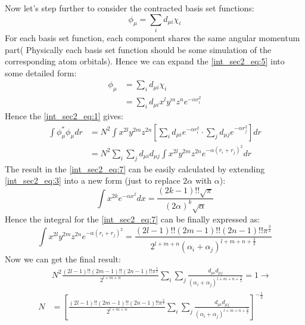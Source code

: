 Now let's step further to consider the contracted basis set functions:
\begin{equation}
  \label{int_sec2_eq:5}
\phi_{\mu} = \sum_{i}d_{\mu i}\chi_{i}
\end{equation}
For each basis set function, each component shares the same angular momentum part(
Physically each basis set function should be some simulation of the corresponding
atom orbitals). Hence we can expand the \ref{int_sec2_eq:5} into some detailed form:
\begin{align}
 \label{int_sec2_eq:6}
\phi_{\mu} &= \sum_{i}d_{\mu i}\chi_{i} \nonumber \\
&= \sum_{i}d_{\mu i} x^{l}y^{m}z^{n}e^{-\alpha r_{i}^{2}} 
\end{align}
Hence the \ref{int_sec2_eq:1} gives:
\begin{equation}
 \label{int_sec2_eq:7}
\begin{split}
 \int \phi_{\mu}^{*}\phi_{\mu} dr &= N^{2}\int x^{2l}y^{2m}z^{2n}
\left[ \sum_{i}d_{\mu i}e^{-\alpha r_{i}^{2}}\cdot\sum_{j}d_{\mu j}e^{-\alpha r_{j}^{2}}\right]
dr \\ 
&= N^{2}\sum_{i}\sum_{j}d_{\mu i}d_{\mu j}\int x^{2l}y^{2m}z^{2n}
e^{-\alpha (r_{i}+r_{j})^{2}} dr
\end{split}
\end{equation}
The result in the \ref{int_sec2_eq:7} can be easily calculated by extending \ref{int_sec2_eq:3}
into a new form (just to replace $2\alpha$ with $\alpha$):
\begin{equation}
 \label{int_sec2_eq:8}
\int x^{2k}e^{-\alpha x^{2}} dx = 
\frac{(2k-1)!!\sqrt{\pi}}{(2\alpha)^{k}\sqrt{\alpha}}
\end{equation}
Hence the integral for the \ref{int_sec2_eq:7} can be finally expressed as:
\begin{equation}
 \label{int_sec2_eq:9}
\int x^{2l}y^{2m}z^{2n}e^{-\alpha (r_{i}+r_{j})^{2}} = 
\frac{(2l-1)!!(2m-1)!!(2n-1)!!\pi^{\frac{3}{2}}}{2^{l+m+n}(\alpha_{i}+\alpha_{j})^{l+m+n+\frac{3}{2}}}
\end{equation}
Now we can get the final result:
\begin{align}
 \label{int_sec2_eq:10}
& N^{2}\frac{(2l-1)!!(2m-1)!!(2n-1)!!\pi^{\frac{3}{2}}}{2^{l+m+n}}
\sum_{i}\sum_{j}\frac{d_{\mu i}d_{\mu j}}{(\alpha_{i}+\alpha_{j})^{l+m+n+\frac{3}{2}}}
 = 1\rightarrow \nonumber \\
N &= \left[ 
\frac{(2l-1)!!(2m-1)!!(2n-1)!!\pi^{\frac{3}{2}}}{2^{l+m+n}}
\sum_{i}\sum_{j}\frac{d_{\mu i}d_{\mu j}}{(\alpha_{i}+\alpha_{j})^{l+m+n+\frac{3}{2}}} 
\right]^{-\frac{1}{2}}  
\end{align}

